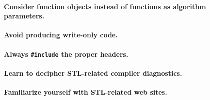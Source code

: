 \documentclass{article}
\begin{document}
\paragraph{Consider function objects instead of functions as algorithm parameters.}
\paragraph{Avoid producing write-only code.}
\paragraph{Always {\tt \#include} the proper headers.}
\paragraph{Learn to decipher STL-related compiler diagnostics.}
\paragraph{Familiarize yourself with STL-related web sites.}
\end{document}
